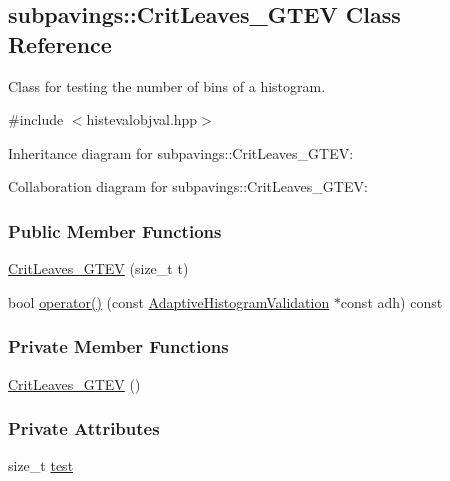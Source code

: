 \hypertarget{classsubpavings_1_1CritLeaves__GTEV}{\subsection{subpavings\-:\-:\-Crit\-Leaves\-\_\-\-G\-T\-E\-V \-Class \-Reference}
\label{classsubpavings_1_1CritLeaves__GTEV}
}


\-Class for testing the number of bins of a histogram.  




{\ttfamily \#include $<$histevalobjval.\-hpp$>$}



\-Inheritance diagram for subpavings\-:\-:\-Crit\-Leaves\-\_\-\-G\-T\-E\-V\-:


\-Collaboration diagram for subpavings\-:\-:\-Crit\-Leaves\-\_\-\-G\-T\-E\-V\-:
\subsubsection*{\-Public \-Member \-Functions}
\begin{DoxyCompactItemize}
\item 
\hyperlink{classsubpavings_1_1CritLeaves__GTEV_af476aff8ed1cba5642698b9b7510e9bc}{\-Crit\-Leaves\-\_\-\-G\-T\-E\-V} (size\-\_\-t t)
\item 
bool \hyperlink{classsubpavings_1_1CritLeaves__GTEV_a89c436b8604c88d2b49e97b6015039bf}{operator()} (const \hyperlink{classsubpavings_1_1AdaptiveHistogramValidation}{\-Adaptive\-Histogram\-Validation} $\ast$const adh) const 
\end{DoxyCompactItemize}
\subsubsection*{\-Private \-Member \-Functions}
\begin{DoxyCompactItemize}
\item 
\hyperlink{classsubpavings_1_1CritLeaves__GTEV_a1d532ecb400345956848b55954a747e3}{\-Crit\-Leaves\-\_\-\-G\-T\-E\-V} ()
\end{DoxyCompactItemize}
\subsubsection*{\-Private \-Attributes}
\begin{DoxyCompactItemize}
\item 
size\-\_\-t \hyperlink{classsubpavings_1_1CritLeaves__GTEV_a13c42d36731adfa02041fa1a62812ed4}{test}
\end{DoxyCompactItemize}


